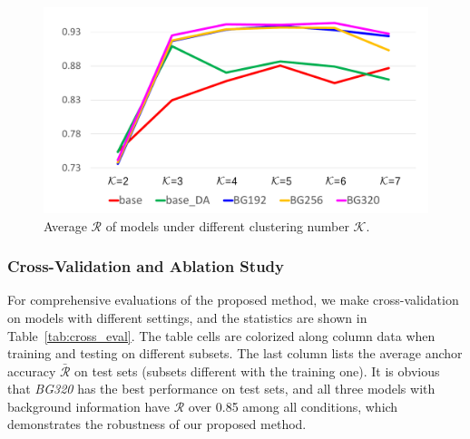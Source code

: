 \documentclass[letterpaper, 10 pt, conference]{ieeeconf}  %
\begin{document}
\begin{figure}[]
	\centering
	\includegraphics[scale=0.25]{kmeans_exp.pdf}
	\caption{Average $\mathcal{R}$ of models under different clustering number $\mathcal{K}$.}
	\label{fig:kmeans_exp}
\end{figure}

\subsubsection{Cross-Validation and Ablation Study}

%
%
For comprehensive evaluations of the proposed method, we make cross-validation on models with different settings, and the statistics are shown in Table~\ref{tab:cross_eval}. The table cells are colorized along column data when training and testing on different subsets. The last column lists the average anchor accuracy $\bar{\mathcal{R}}$ on test sets (subsets different with the training one). It is obvious that \textit{BG320} has the best performance on test sets, and all three models with background information have $\mathcal{R}$ over 0.85 among all conditions, which demonstrates the robustness of our proposed method.
\end{document}
